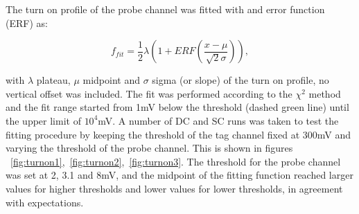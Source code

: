 \documentclass[12pt]{article}
\begin{document}
The turn on profile of the probe channel was fitted with and error function (ERF) as:

\begin{equation}
 f_{fit} = \frac{1}{2} \lambda(1+ERF(\frac{x-\mu}{\sqrt{2}\sigma}))  ,
 \label{f_fit}
\end{equation}

with $\lambda$ plateau, $\mu$ midpoint and $\sigma$ sigma (or slope) of the turn on profile, no vertical offset was included. The fit was performed according to the $\chi^{2}$ method and the fit range started from 1mV below the threshold (dashed green line) until the upper limit of $10^{4}$mV. A number of DC and SC runs was taken to test the fitting procedure by keeping the threshold of the tag channel fixed at 300mV and varying the threshold of the probe channel. This is shown in figures ~\ref{fig:turnon1},~\ref{fig:turnon2},~\ref{fig:turnon3}. The threshold for the probe channel was set at 2, 3.1 and 8mV, and the midpoint of the fitting function reached larger values for higher thresholds and lower values for lower thresholds, in agreement with expectations. 
\end{document}

